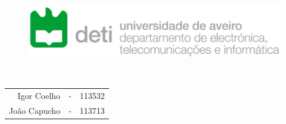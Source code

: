 \makeatletter
\begin{titlepage}

	\begin{figure}[H]
		\centering
		\includegraphics[width=12cm]{figs/deti.png}
	\end{figure}

	\vspace{4cm}

	\begin{center}
		\onehalfspacing\textbf{\huge \@title}\\
		\vspace{1cm}
		{\LARGE \cadeira}

		\vspace{2cm}

		\large
		\begin{tabular}{ r c c }
			Igor Coelho  & - & 113532 \\
			João Capucho & - & 113713
		\end{tabular}
		\vfill
		{\Large \ano}
	\end{center}

\end{titlepage}
\makeatother

